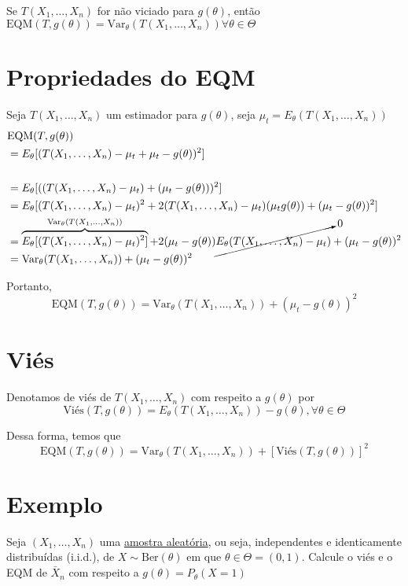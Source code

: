 \documentclass[
  letterpaper,
  DIV=11,
  numbers=noendperiod]{scrreprt}
\begin{document}
Se \(T(X_{1},\dots,X_{n})\) for não viciado para \(g(\theta)\), então
\(\mathrm{EQM}(T,g(\theta))=\mathrm{Var}_{\theta}(T(X_{1},\dots,X_{n})) \forall \theta \in \Theta\)

\section{Propriedades do EQM}\label{propriedades-do-eqm}

Seja \(T(X_{1},\dots,X_{n})\) um estimador para \(g(\theta)\), seja
\(\mu_{t} = E_\theta(T(X_{1},\dots,X_{n}))\) \[
\begin{aligned}
&\mathrm{EQM}(T,g(\theta))\\
&=E_\theta[(T(X_{1},\dots,X_{n})-\mu_{t}+\mu_{t}-g(\theta))^{2}] \\ \\
&= E_\theta[((T(X_{1},\dots,X_{n})- \mu_{t})+ (\mu_{t}-g(\theta)))^{2}] \\
& = E_\theta[(T(X_{1},\dots,X_{n})-\mu_{t})^{2}+2(T(X_{1},\dots,X_{n})-\mu_{t})(\mu_{t}g(\theta))+(\mu_{t}- g(\theta))^{2}] \\
&= \overbrace{E_\theta[(T(X_{1},\dots,X_{n})-\mu_{t})^{2}]}^{\mathrm{Var}_{\theta}(T(X_{1},\dots,X_{n}))} + 2(\mu_{t} -
g(\theta))\cancelto{0}{E_\theta(T(X_{1},\dots,X_{n})-\mu_{t})} + (\mu_{t}-g(\theta))^{2} \\
&=\mathrm{Var}_\theta(T(X_{1},\dots,X_{n})) + (\mu_{t}-g(\theta))^{2}
\end{aligned}
\]

Portanto, \[
\mathrm{EQM}(T,g(\theta)) = \mathrm{Var}_\theta(T(X_{1},\dots,X_{n})) + (\mu_{t}-g(\theta))^{2}
\]

\section{Viés}\label{viuxe9s}

Denotamos de viés de \(T(X_{1},\dots,X_{n})\) com respeito a
\(g(\theta)\) por \[
\mathrm{Viés}(T,g(\theta)) = E_\theta(T(X_{1},\dots,X_{n}))-g(\theta),\forall \theta \in \Theta
\]

Dessa forma, temos que \[
\mathrm{EQM}(T,g(\theta)) = \mathrm{Var}_\theta(T(X_{1},\dots,X_{n})) + [\mathrm{Viés}(T,g(\theta))]^{2}
\]

\section{Exemplo}\label{exemplo-2}

Seja \((X_{1},\dots,X_{n})\) uma \hyperref[sec-aa]{amostra aleatória},
ou seja, independentes e identicamente distribuídas (i.i.d.), de
\(X\sim \mathrm{Ber}(\theta)\) em que \(\theta \in \Theta = (0,1)\).
Calcule o viés e o EQM de \(\bar{X}_{n}\) com respeito a
\(g(\theta)=P_\theta(X=1)\)
\end{document}

